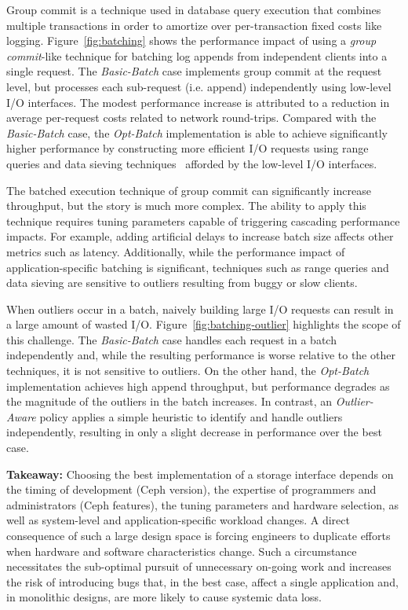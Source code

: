 Group commit is a technique used in database query execution that combines
multiple transactions in order to amortize over per-transaction fixed costs
like logging. Figure~\ref{fig:batching} shows the performance impact of using
a \emph{group commit}-like technique for batching log appends from independent
clients into a single request. The \emph{Basic-Batch} case implements group
commit at the request level, but processes each sub-request (i.e. append)
independently using low-level I/O interfaces. The modest performance increase
is attributed to a reduction in average per-request costs related to network
round-trips. Compared with the \emph{Basic-Batch} case, the \emph{Opt-Batch}
implementation is able to achieve significantly higher performance by
constructing more efficient I/O requests using range queries and data sieving
techniques~\cite{750599} afforded by the low-level I/O interfaces.

The batched execution technique of group commit can significantly increase
throughput, but the story is much more complex. The ability to apply this
technique requires tuning parameters capable of triggering cascading performance impacts.
For example, adding artificial delays to increase batch size affects other metrics such as latency.
Additionally, while the performance impact of application-specific batching is significant,
techniques such as range queries and data sieving are sensitive to outliers
resulting from buggy or slow clients.

When outliers occur in a batch, naively building large I/O requests can result
in a large amount of wasted I/O. Figure~\ref{fig:batching-outlier} highlights
the scope of this challenge. The \emph{Basic-Batch} case handles each request
in a batch independently and, while the resulting performance is worse relative to the
other techniques, it is not sensitive to outliers. On the other hand, the \emph{Opt-Batch}
implementation achieves high append throughput, but performance degrades as
the magnitude of the outliers in the batch increases. In contrast, an
\emph{Outlier-Aware} policy applies a simple heuristic to identify and handle outliers 
independently, resulting in only a slight decrease in
performance over the best case.

\textbf{Takeaway:} Choosing the best implementation of a storage interface
depends on the timing of development (Ceph version), the expertise of
programmers and administrators (Ceph features), the tuning parameters and hardware
selection, as well as system-level and application-specific workload changes.
A direct consequence of such a large design space is forcing engineers
to duplicate efforts when hardware and software characteristics change. Such a 
circumstance necessitates the sub-optimal pursuit of unnecessary on-going work 
and increases the risk of introducing bugs that, in the best case, affect a single application and, in monolithic
designs, are more likely to cause systemic data loss.

